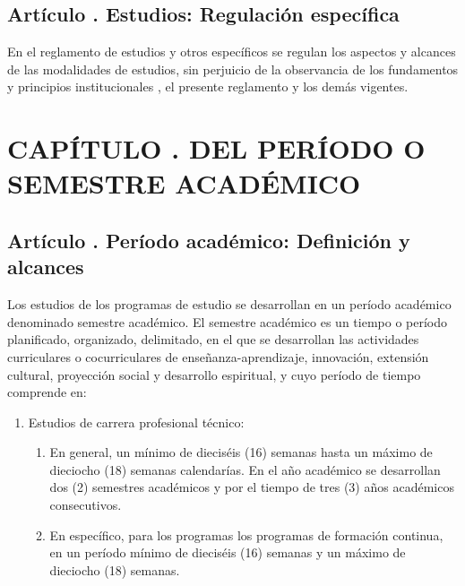 \subsection{Artículo . Estudios: Regulación específica}
\addtocounter{ns}{1}
En el reglamento de estudios y otros específicos se regulan los aspectos y alcances de las modalidades de estudios, sin perjuicio de la observancia de los fundamentos y principios institucionales , el presente reglamento y los demás vigentes. 
\section{CAPÍTULO . DEL PERÍODO O SEMESTRE ACADÉMICO}
\addtocounter{re}{1}

\subsection{Artículo . Período académico: Definición y alcances}
\addtocounter{ns}{1}
Los estudios de los programas de estudio se desarrollan en un período académico denominado semestre académico.  El semestre académico es un tiempo o período planificado, organizado, delimitado, en el que se desarrollan las actividades curriculares o cocurriculares de enseñanza-aprendizaje, innovación, extensión cultural, proyección social y desarrollo espiritual, y cuyo período de tiempo comprende en: 
\begin{enumerate}
\item Estudios de carrera profesional técnico:  
	\begin{enumerate}
		\item En general, un mínimo de dieciséis (16) semanas hasta un máximo de dieciocho (18) semanas calendarías. En el año académico se desarrollan dos (2) semestres académicos y por el tiempo de tres (3) años académicos consecutivos.  
		\item En específico, para los programas los programas de formación continua, en un período mínimo de dieciséis (16) semanas y un máximo de dieciocho (18) semanas.  
	\end{enumerate}
\end{enumerate}
